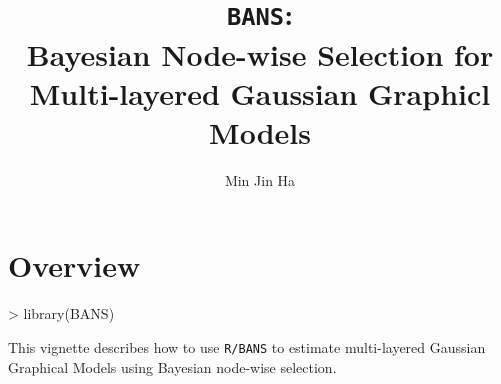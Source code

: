 \documentclass{article}
\begin{document}



\title{\texttt{BANS}:\\ Bayesian Node-wise Selection for Multi-layered Gaussian Graphicl Models}
\author{Min Jin Ha}
\maketitle

\section{Overview}
\begin{Schunk}
\begin{Sinput}
> library(BANS)
\end{Sinput}
\end{Schunk}
This vignette describes how to use \texttt{R/BANS} to estimate multi-layered Gaussian Graphical Models using Bayesian node-wise selection.
\end{document}
